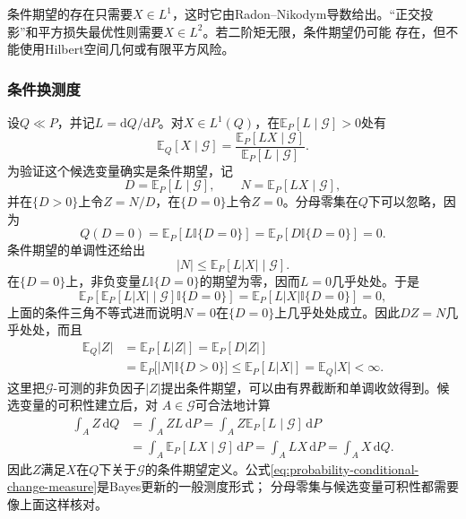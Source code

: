 条件期望的存在只需要\(X\in L^1\)，这时它由Radon--Nikodym导数给出。“正交投影”和平方损失最优性则需要\(X\in L^2\)。若二阶矩无限，条件期望仍可能
存在，但不能使用Hilbert空间几何或有限平方风险。

\subsubsection{条件换测度}

设\(Q\ll P\)，并记\(L=\mathrm{d}Q/\mathrm{d}P\)。对\(X\in L^1(Q)\)，在\(\mathbb{E}_P[L\mid\mathcal{G}]>0\)处有
\begin{equation}
  \mathbb{E}_Q[X\mid\mathcal{G}]
  =
  \frac{\mathbb{E}_P[LX\mid\mathcal{G}]}
       {\mathbb{E}_P[L\mid\mathcal{G}]}.
  \label{eq:probability-conditional-change-measure}
\end{equation}
为验证这个候选变量确实是条件期望，记
\[
  D=\mathbb{E}_P[L\mid\mathcal{G}],
  \qquad
  N=\mathbb{E}_P[LX\mid\mathcal{G}],
\]
并在\(\{D>0\}\)上令\(Z=N/D\)，在\(\{D=0\}\)上令\(Z=0\)。分母零集在\(Q\)下可以忽略，因为
\[
  Q(D=0)
  =
  \mathbb{E}_P[L\mathbb{I}\{D=0\}]
  =
  \mathbb{E}_P[D\mathbb{I}\{D=0\}]
  =0.
\]
条件期望的单调性还给出
\[
  |N|
  \leq
  \mathbb{E}_P[L|X|\mid\mathcal{G}].
\]
在\(\{D=0\}\)上，非负变量\(L\mathbb{I}\{D=0\}\)的期望为零，因而\(L=0\)几乎处处。于是
\[
  \mathbb{E}_P\left[
    \mathbb{E}_P[L|X|\mid\mathcal{G}]
    \mathbb{I}\{D=0\}
  \right]
  =
  \mathbb{E}_P[L|X|\mathbb{I}\{D=0\}]
  =0,
\]
上面的条件三角不等式进而说明\(N=0\)在\(\{D=0\}\)上几乎处处成立。因此\(DZ=N\)几乎处处，而且
\[
  \begin{aligned}
    \mathbb{E}_Q|Z|
    &=
    \mathbb{E}_P[L|Z|]
    =
    \mathbb{E}_P[D|Z|]\\
    &=
    \mathbb{E}_P\bigl[|N|\mathbb{I}\{D>0\}\bigr]
    \leq
    \mathbb{E}_P[L|X|]
    =
    \mathbb{E}_Q|X|<\infty.
  \end{aligned}
\]
这里把\(\mathcal{G}\)-可测的非负因子\(|Z|\)提出条件期望，可以由有界截断和单调收敛得到。候选变量的可积性建立后，对
\(A\in\mathcal{G}\)可合法地计算
\[
  \begin{aligned}
    \int_A Z\,\mathrm{d}Q
    &=
    \int_A ZL\,\mathrm{d}P
    =
    \int_A Z\mathbb{E}_P[L\mid\mathcal{G}]\,\mathrm{d}P\\
    &=
    \int_A \mathbb{E}_P[LX\mid\mathcal{G}]\,\mathrm{d}P
    =
    \int_A LX\,\mathrm{d}P
    =
    \int_A X\,\mathrm{d}Q.
  \end{aligned}
\]
因此\(Z\)满足\(X\)在\(Q\)下关于\(\mathcal{G}\)的条件期望定义。公式\eqref{eq:probability-conditional-change-measure}是Bayes更新的一般测度形式；
分母零集与候选变量可积性都需要像上面这样核对。

